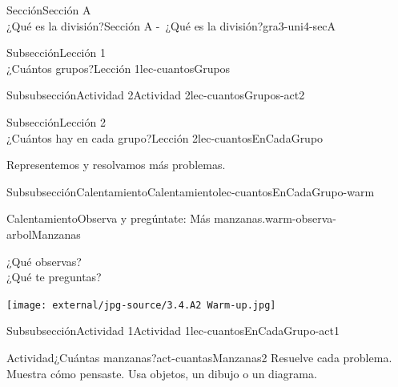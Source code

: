 \begin{sectionptx}{Sección}{{\Large Sección A\\}¿Qué es la división?}{}{Sección A -~¿Qué es la división?}{}{}{gra3-uni4-secA}
\begin{subsectionptx}{Subsección}{{\normalsize Lección 1\\[-0.05cm]}¿Cuántos grupos?}{}{Lección 1}{}{}{lec-cuantosGrupos}
\begin{subsubsectionptx}{Subsubsección}{Actividad 2}{}{Actividad 2}{}{}{lec-cuantosGrupos-act2}
\end{subsubsectionptx}
\end{subsectionptx}
%
%
\typeout{************************************************}
\typeout{************************************************}
%
\begin{subsectionptx}{Subsección}{{\normalsize Lección 2\\[-0.05cm]}¿Cuántos hay en cada grupo?}{}{Lección 2}{}{}{lec-cuantosEnCadaGrupo}
\begin{introduction}{}%
Representemos y resolvamos más problemas.%
\end{introduction}%
%
%
\typeout{************************************************}
\typeout{************************************************}
%
\begin{subsubsectionptx}{Subsubsección}{Calentamiento}{}{Calentamiento}{}{}{lec-cuantosEnCadaGrupo-warm}
\begin{exploration}{Calentamiento}{Observa y pregúntate: Más manzanas.}{warm-observa-arbolManzanas}%
\begin{sidebyside}{2}{0.0}{0.0}{0.05}%
\begin{sbspanel}{0.4}%
¿Qué observas?\\
 ¿Qué te preguntas?%
\end{sbspanel}%
\begin{sbspanel}{0.55}%
\begin{image}{0.15}{0.7}{0.15}{}%
\texttt{[image: external/jpg-source/3.4.A2 Warm-up.jpg]}
\end{image}%
\end{sbspanel}%
\end{sidebyside}%
\end{exploration}%
%
\end{subsubsectionptx}
%
%
\typeout{************************************************}
\typeout{************************************************}
%
\begin{subsubsectionptx}{Subsubsección}{Actividad 1}{}{Actividad 1}{}{}{lec-cuantosEnCadaGrupo-act1}
\begin{activity}{Actividad}{¿Cuántas manzanas?}{act-cuantasManzanas2}%
Resuelve cada problema. Muestra cómo pensaste. Usa objetos, un dibujo o un diagrama.%
\par

\end{activity}
\end{subsubsectionptx}
\end{subsectionptx}
\end{sectionptx}
